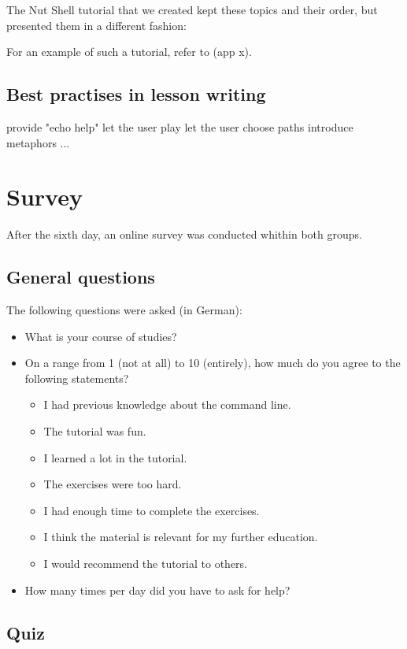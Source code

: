 \documentclass[twoside,parskip]{scrreprt}
\begin{document}
The Nut Shell tutorial that we created kept these topics and their order, but presented them in a different fashion: 

For an example of such a tutorial, refer to (app x).

\subsection{Best practises in lesson writing}

provide "echo help"
let the user play
let the user choose paths
introduce metaphors
...

\section{Survey}

After the sixth day, an online survey was conducted whithin both groups.

\subsection{General questions}

The following questions were asked (in German):

\begin{itemize}
    \item What is your course of studies?
    \item On a range from 1 (not at all) to 10 (entirely), how much do you agree to the following statements?
        \begin{itemize}
            \item I had previous knowledge about the command line.
            \item The tutorial was fun.
            \item I learned a lot in the tutorial.
            \item The exercises were too hard.
            \item I had enough time to complete the exercises.
            \item I think the material is relevant for my further education.
            \item I would recommend the tutorial to others.
        \end{itemize}
    \item How many times per day did you have to ask for help?
\end{itemize}

\subsection{Quiz}
\end{document}

